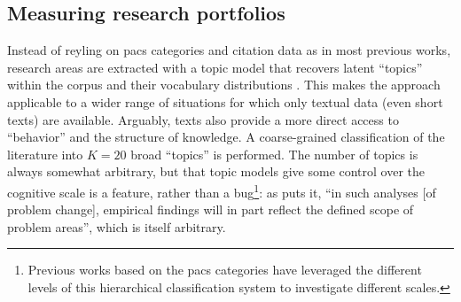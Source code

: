 \documentclass{article}
\begin{document}
\subsection{\label{sec:topics}Measuring research portfolios}

Instead of reyling on \gls{pacs} categories and citation data as in most previous works, research areas are extracted with a topic model that recovers latent ``topics'' within the corpus and their vocabulary distributions \citep{Blei2003,Griffiths2004}. This makes the approach applicable to a wider range of situations for which only textual data (even short texts) are available. Arguably, texts also provide a more direct access to ``behavior'' and the structure of knowledge. A coarse-grained classification of the literature into $K=20$ broad ``topics'' is performed. The number of topics is always somewhat arbitrary, but that topic models give some control over the cognitive scale is a feature, rather than a bug\footnote{Previous works based on the \gls{pacs} categories have leveraged the different levels of this hierarchical classification system to investigate different scales.}: as \citet{Gieryn1978} puts it, ``in such analyses [of problem change], empirical findings will in part reflect the defined scope of problem areas'', which is itself arbitrary.
\end{document}
